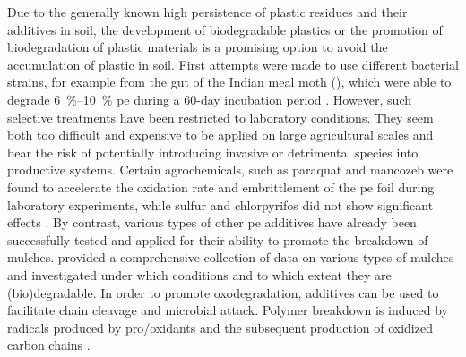 Due to the generally known high persistence of plastic residues and their additives in soil, the development of biodegradable plastics or the promotion of biodegradation of plastic materials is a promising option to avoid the accumulation of plastic in soil. First attempts were made to use different bacterial strains, for example from the gut of the Indian meal moth (), which were able to degrade \SIrange{6}{10}{\percent} \ac{pe} during a \num{60}-day incubation period \citep{HadadBiodegradation2005,KruegerProspects2015,YangPlastic2015}. However, such selective treatments have been restricted to laboratory conditions. They seem both too difficult and expensive to be applied on large agricultural scales and bear the risk of potentially introducing invasive or detrimental species into productive systems. Certain agrochemicals, such as paraquat and mancozeb were found to accelerate the oxidation rate and embrittlement of the \ac{pe} foil during laboratory experiments, while sulfur and chlorpyrifos did not show significant effects \citep{YehEffect2015}. By contrast, various types of other \ac{pe} additives have already been successfully tested and applied for their ability to promote the breakdown of mulches.  provided a comprehensive collection of data on various types of mulches and investigated under which conditions and to which extent they are (bio)degradable. In order to promote oxodegradation, additives can be used to facilitate chain cleavage and microbial attack. Polymer breakdown is induced by radicals produced by pro\-/oxidants and the subsequent production of oxidized carbon chains \citep{BriassoulisDegradation2015}.
